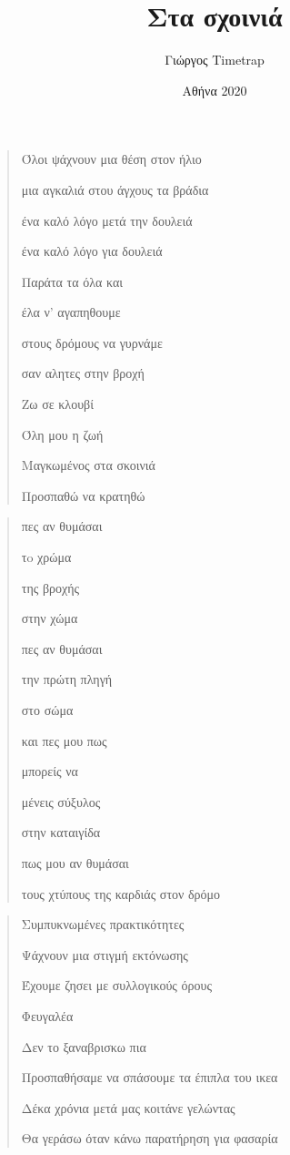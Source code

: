 \documentclass[12pt]{article}
\title{Στα σχοινιά}
\date{Αθήνα 2020}
\author{Γιώργος \latintext Timetrap}
\begin{document}
\maketitle

\begin{verse}
  Όλοι ψάχνουν μια θέση στον ήλιο

  μια αγκαλιά στου άγχους τα βράδια

  ένα καλό λόγο μετά την δουλειά

  ένα καλό λόγο για δουλειά

  Παράτα τα όλα και

  έλα ν' αγαπηθουμε

  στους δρόμους να γυρνάμε

  σαν αλητες στην βροχή

  Ζω σε κλουβί

  Όλη μου η ζωή

  Μαγκωμένος στα σκοινιά

  Προσπαθώ να κρατηθώ
\end{verse}


\begin{verse}
  πες αν θυμάσαι

  τo χρώμα

  της βροχής

  στην χώμα

  πες αν θυμάσαι

  την πρώτη πληγή

  στο σώμα

  και πες μου πως

  μπορείς να

  μένεις σύξυλος

  στην καταιγίδα

  πως μου αν θυμάσαι

  τους χτύπους της καρδιάς στον δρόμο
\end{verse}

\begin{verse}
  Συμπυκνωμένες πρακτικότητες

  Ψάχνουν μια στιγμή εκτόνωσης

  Έχουμε ζησει με συλλογικούς όρους

  Φευγαλέα

  Δεν το ξαναβρισκω πια

  Προσπαθήσαμε να σπάσουμε τα έπιπλα του ικεα

  Δέκα χρόνια μετά μας κοιτάνε γελώντας

  Θα γεράσω όταν κάνω παρατήρηση για φασαρία
\end{verse}
\end{document}
